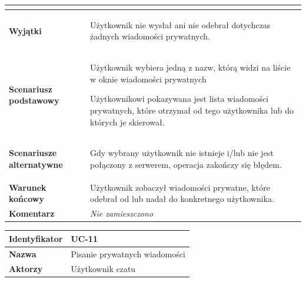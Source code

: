 {\begin{tabular}{ | l | l | }
{		}
		\\

	\hline
		\textbf{Wyjątki} & \parbox[t]{11cm}{
		\begin{enumreq}
		 \item Użytkownik nie wysłał ani nie odebrał dotychczas żadnych wiadomości
		 prywatnych.
	 	\end{enumreq}

		}
		\\

	\hline
		\textbf{Scenariusz podstawowy} & \parbox[t]{11cm}{
			\begin{enumreq}
				\item Użytkownik wybiera jedną z nazw, którą widzi na liście w oknie
				wiadomości prywatnych
				\item Użytkownikowi pokazywana jest lista wiadomości prywatnych, które
				otrzymał od tego użytkownika lub do których je skierował.
			\end{enumreq}
		}
		\\

	\hline
		\textbf{Scenariusze alternatywne} & \parbox[t]
		{11cm}{
			\begin{enumreq}
				\item Gdy wybrany użytkownik nie istnieje i/lub nie jest połączony z
				serwerem, operacja zakończy się błędem.
			\end{enumreq}
		}
		\\

	\hline
		\textbf{Warunek końcowy} & \parbox[t]{11cm}{
			Użytkownik zobaczył wiadomości prywatne, które odebrał od lub nadał do
			konkretnego użytkownika.
		}
		\\

	\hline
		\textbf{Komentarz} & \parbox[t]{11cm}{
			\textit{Nie zamieszczono}
		}
		\\

	\hline
\end{tabular}

\vspace{2em}

\begin{tabular}{ | l | l | }
	\hline
		\textbf{Identyfikator} &
		UC-11
		\\

	\hline
		\textbf{Nazwa} &
		Pisanie prywatnych wiadomości
		\\

	\hline
		\textbf{Aktorzy} & \parbox[t]{11cm}{
			Użytkownik czatu
		}\\


\end{tabular}}

